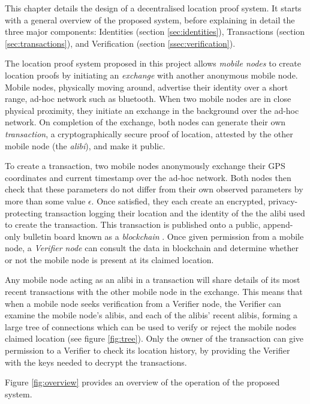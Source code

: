 This chapter details the design of a decentralised location proof system. It starts with a general overview of the proposed system, before explaining in detail the three major components: Identities (section \ref{sec:identities}), Transactions (section \ref{sec:transactions}), and Verification (section \ref{ssec:verification}).

The location proof system proposed in this project allows \textit{mobile nodes} to create location proofs by initiating an \textit{exchange} with another anonymous mobile node. Mobile nodes, physically moving around, advertise their identity over a short range, ad-hoc network such as bluetooth. When two mobile nodes are in close physical proximity, they initiate an exchange in the background over the ad-hoc network. On completion of the exchange, both nodes can generate their own \textit{transaction}, a cryptographically secure proof of location, attested by the other mobile node (the \textit{alibi}), and make it public.

To create a transaction, two mobile nodes anonymously exchange their GPS coordinates and current timestamp over the ad-hoc network. Both nodes then check that these parameters do not differ from their own observed parameters by more than some value $\epsilon$. Once satisfied, they each create an encrypted, privacy-protecting transaction logging their location and the identity of the the alibi used to create the transaction. This transaction is published onto a public, append-only bulletin board known as a \textit{blockchain} \cite{blueprint}. Once given permission from a mobile node, a \textit{Verifier node} can consult the data in blockchain and determine whether or not the mobile node is present at its claimed location.

Any mobile node acting as an alibi in a transaction will share details of its most recent transactions with the other mobile node in the exchange. This means that when a mobile node seeks verification from a Verifier node, the Verifier can examine the mobile node's alibis, and each of the alibis' recent alibis, forming a large tree of connections which can be used to verify or reject the mobile nodes claimed location (see figure \ref{fig:tree}). Only the owner of the transaction can give permission to a Verifier to check its location history, by providing the Verifier with the keys needed to decrypt the transactions.

Figure \ref{fig:overview} provides an overview of the operation of the proposed system.

